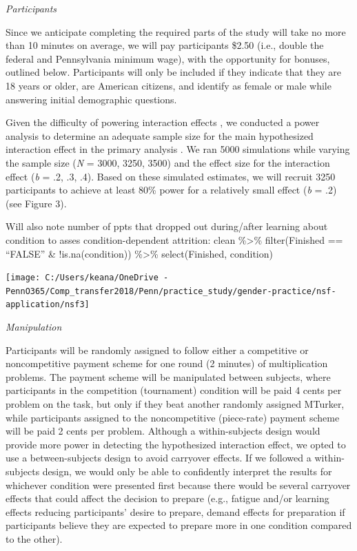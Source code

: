 \documentclass[a4paper, nobind]{templates/ociamthesis}
\begin{document}
\emph{Participants}

Since we anticipate completing the required parts of the study will take no more than 10 minutes on average, we will pay participants \$2.50 (i.e., double the federal and Pennsylvania minimum wage), with the opportunity for bonuses, outlined below. Participants will only be included if they indicate that they are 18 years or older, are American citizens, and identify as female or male while answering initial demographic questions.

Given the difficulty of powering interaction effects \autocites[see][]{Simonsohn2014,Giner-Sorolla2018}, we conducted a power analysis to determine an adequate sample size for the main hypothesized interaction effect in the primary analysis \autocite[simulations modeled after code from][]{Hughes2017a}. We ran 5000 simulations while varying the sample size (\emph{N} = 3000, 3250, 3500) and the effect size for the interaction effect (\emph{b} = .2, .3, .4). Based on these simulated estimates, we will recruit 3250 participants to achieve at least 80\% power for a relatively small effect (\emph{b} = .2) (see Figure 3).

Will also note number of ppts that dropped out during/after learning about condition to asses condition-dependent attrition: clean \%\textgreater\% filter(Finished == ``FALSE'' \& !is.na(condition)) \%\textgreater\% select(Finished, condition)

\texttt{[image: C:/Users/keana/OneDrive - PennO365/Comp\_transfer2018/Penn/practice\_study/gender-practice/nsf-application/nsf3]}

\emph{Manipulation}

Participants will be randomly assigned to follow either a competitive or noncompetitive payment scheme for one round (2 minutes) of multiplication problems. The payment scheme will be manipulated between subjects, where participants in the competition (tournament) condition will be paid 4 cents per problem on the task, but only if they beat another randomly assigned MTurker, while participants assigned to the noncompetitive (piece-rate) payment scheme will be paid 2 cents per problem. Although a within-subjects design would provide more power in detecting the hypothesized interaction effect, we opted to use a between-subjects design to avoid carryover effects. If we followed a within-subjects design, we would only be able to confidently interpret the results for whichever condition were presented first because there would be several carryover effects that could affect the decision to prepare (e.g., fatigue and/or learning effects reducing participants' desire to prepare, demand effects for preparation if participants believe they are expected to prepare more in one condition compared to the other).
\end{document}
